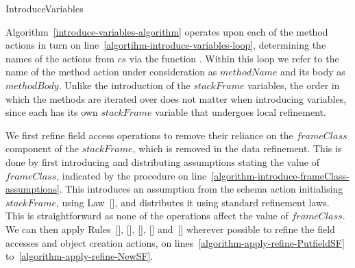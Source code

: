 \begin{algorithm}
  \caption{IntroduceVariables}
  \label{introduce-variables-algorithm}
\end{algorithm}

Algorithm~\ref{introduce-variables-algorithm} operates upon each of
the method actions in turn on
line~\ref{algortihm-introduce-variables-loop}, determining the names
of the actions from $cs$ via the function .
Within this loop we refer to the name of the method action under
consideration as $methodName$ and its body as $methodBody$.
Unlike the introduction of the $stackFrame$ variables, the order in
which the methods are iterated over does not matter when introducing
variables, since each has its own $stackFrame$ variable that undergoes
local refinement.

We first refine field access operations to remove their reliance on
the $frameClass$ component of the $stackFrame$, which is removed in
the data refinement.
This is done by first introducing and distributing assumptions stating
the value of $frameClass$, indicated by the procedure
 on
line~\ref{algorithm-introduce-frameClass-assumptions}.
This introduces an assumption from the schema action initialising
$stackFrame$, using Law~[], and
distributes it using standard refinement laws.
This is straightforward as none of the operations affect the value of
$frameClass$.
We can then apply Rules~[],
[],
[],
[] and~[]
wherever possible to refine the field accesses and object creation
actions, on lines~\ref{algorithm-apply-refine-PutfieldSF}
to~\ref{algorithm-apply-refine-NewSF}.

